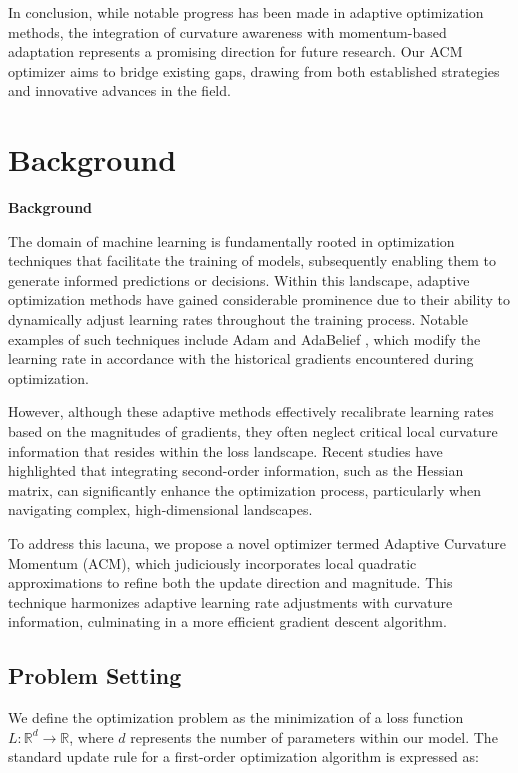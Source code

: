 \documentclass{article} %
\begin{document}
In conclusion, while notable progress has been made in adaptive optimization methods, the integration of curvature awareness with momentum-based adaptation represents a promising direction for future research. Our ACM optimizer aims to bridge existing gaps, drawing from both established strategies and innovative advances in the field.

\section{Background}
\label{sec:background}
\textbf{Background}

The domain of machine learning is fundamentally rooted in optimization techniques that facilitate the training of models, subsequently enabling them to generate informed predictions or decisions. Within this landscape, adaptive optimization methods have gained considerable prominence due to their ability to dynamically adjust learning rates throughout the training process. Notable examples of such techniques include Adam \cite{kingma2014adam} and AdaBelief \cite{zhang2020adaptive}, which modify the learning rate in accordance with the historical gradients encountered during optimization.

However, although these adaptive methods effectively recalibrate learning rates based on the magnitudes of gradients, they often neglect critical local curvature information that resides within the loss landscape. Recent studies \cite{reddi2018adaptive, cohen2020adaptive} have highlighted that integrating second-order information, such as the Hessian matrix, can significantly enhance the optimization process, particularly when navigating complex, high-dimensional landscapes.

To address this lacuna, we propose a novel optimizer termed Adaptive Curvature Momentum (ACM), which judiciously incorporates local quadratic approximations to refine both the update direction and magnitude. This technique harmonizes adaptive learning rate adjustments with curvature information, culminating in a more efficient gradient descent algorithm.

\subsection{Problem Setting}

We define the optimization problem as the minimization of a loss function $L: \mathbb{R}^d \rightarrow \mathbb{R}$, where $d$ represents the number of parameters within our model. The standard update rule for a first-order optimization algorithm is expressed as:
\end{document}
